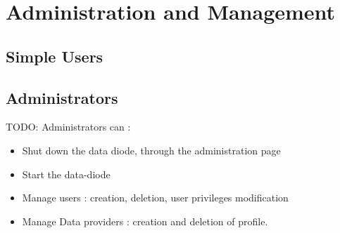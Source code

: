 \documentclass[a4paper,11pt]{article}
\begin{document}
\section{Administration and Management}
\subsection{Simple Users}

\subsection{Administrators}
TODO:
Administrators can :
\begin{itemize}
\item{Shut down the data diode, through the administration page}
\item{Start the data-diode}
\item{Manage users : creation, deletion, user privileges modification}
\item{Manage Data providers : creation and deletion of profile.}
\end{itemize}
\end{document}
